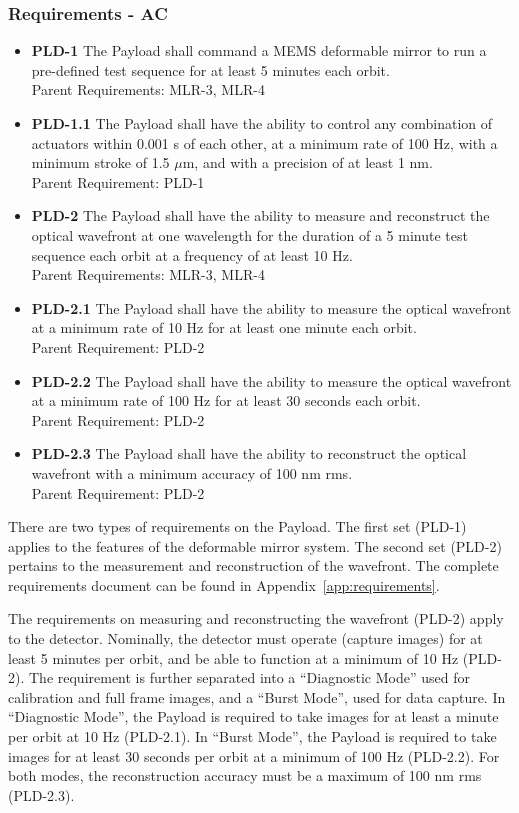 \documentclass[12pt]{article}
\begin{document}
\subsubsection{Requirements - AC}\label{sec:payload_requirements}

\begin{itemize}
\item \textbf{PLD-1} The Payload shall command a MEMS deformable mirror to run a pre-defined test sequence for at least 5 minutes each orbit. \\ 
Parent Requirements: MLR-3, MLR-4
\item \textbf{PLD-1.1} The Payload shall have the ability to control any combination of actuators within 0.001 s of each other, at a minimum rate of 100 Hz, with a minimum stroke of 1.5  $\mu$m, and with a precision of at least 1 nm.\\
Parent Requirement: PLD-1
\item \textbf{PLD-2} The Payload shall have the ability to measure and reconstruct the optical wavefront at one wavelength for the duration of a 5 minute test sequence each orbit at a frequency of at least 10 Hz.\\
Parent Requirements: MLR-3, MLR-4
\item \textbf{PLD-2.1} The Payload shall have the ability to measure the optical wavefront at a minimum rate of 10 Hz for at least one minute each orbit.\\
Parent Requirement: PLD-2
\item \textbf{PLD-2.2} The Payload shall have the ability to measure the optical wavefront at a minimum rate of 100 Hz for at least 30 seconds each orbit.\\
Parent Requirement: PLD-2
\item \textbf{PLD-2.3} The Payload shall have the ability to reconstruct the optical wavefront with a minimum accuracy of 100 nm rms.\\
Parent Requirement: PLD-2
\end{itemize}

There are two types of requirements on the Payload.  The first set (PLD-1) applies to the features of the deformable mirror system.  The second set (PLD-2) pertains to the measurement and reconstruction of the wavefront.  The complete requirements document can be found in Appendix~\ref{app:requirements}. 

The requirements on measuring and reconstructing the wavefront (PLD-2) apply to the detector.  Nominally, the detector must operate (capture images) for at least 5 minutes per orbit, and be able to function at a minimum of 10 Hz (PLD-2). The requirement is further separated into a ``Diagnostic Mode'' used for calibration and full frame images, and a ``Burst Mode'', used for data capture.  In ``Diagnostic Mode'', the Payload is required to take images for at least a minute per orbit at 10 Hz (PLD-2.1).  In ``Burst Mode'', the Payload is required to take images for at least 30 seconds per orbit at a minimum of 100 Hz (PLD-2.2).  For both modes, the reconstruction accuracy must be a maximum of 100 nm rms (PLD-2.3).
			
\end{document}
